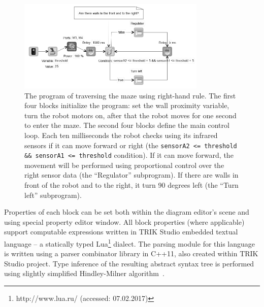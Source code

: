 \documentclass[conference]{IEEEtran}
\begin{document}
\begin{figure}[ht]
    \includegraphics[width=0.8\textwidth]{TS_CF_Labyrinth_Diagram.png}
    \caption{The program of traversing the maze using right-hand rule. The first four blocks initialize the program: set the wall proximity variable, turn the robot motors on, after that the robot moves for one second to enter the maze. The second four blocks define the main control loop. Each ten milliseconds the robot checks using its infrared sensors if it can move forward or right (the \texttt{sensorA2 <= threshold \&\& sensorA1 <= threshold} condition). If it can move forward, the movement will be performed using proportional control over the right sensor data (the ``Regulator'' subprogram). If there are walls in front of the robot and to the right, it turn 90 degrees left (the ``Turn left'' subprogram).}
    \label{image:TS_CF_Example}
\end{figure}

Properties of each block can be set both within the diagram editor's scene and using special property editor window. All block properties (where applicable) support computable expressions written in TRIK Studio embedded textual language -- a statically typed Lua\footnote{http://www.lua.ru/ (accessed: 07.02.2017)} dialect. The parsing module for this language is written using a parser combinator library in C++11, also created within TRIK Studio project. Type inference of the resulting abstract syntax tree is performed using slightly simplified Hindley-Milner algorithm~\cite{damas1982principal}.
\end{document}
